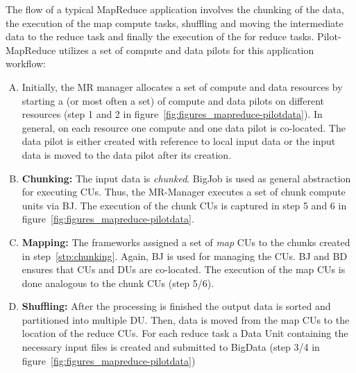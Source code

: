 \documentclass{acm_proc_article-sp}
\newcommand{\jhanote}[1]{ {\textcolor{red} { ***shantenu: #1 }}}
\newcommand{\alnote}[1]{ {\textcolor{blue} { ***andreL: #1 }}}
\newcommand{\pnote}[1]{ {\textcolor{magenta} { ***pradeep: #1 }}}
\newcommand{\alnote}[1]{}
\newcommand{\pnote}[1]{}
\newcommand{\jhanote}[1]{}
\newcommand{\pilotmapreduce}{Pilot-MapReduce\xspace}
\begin{document}
The flow of a typical MapReduce application involves the chunking of
the data, the execution of the map compute tasks, shuffling and moving
the intermediate data to the reduce task and finally the execution of
the for reduce tasks.  \pilotmapreduce utilizes a set of compute and
data pilots for this application workflow: %
\begin{enumerate}[A.]
	\item Initially, the MR manager allocates a set of compute and data 
	resources by starting a (or most often a set) of compute and data pilots on 
	different resources (step 1 and 2 in 
	figure~\ref{fig:figures_mapreduce-pilotdata}). In
	general, on each resource one compute and one data pilot is co-located. The 
	data pilot is either created with reference to local input data or the input 
	data is moved to the data pilot after its creation.

	\item \textbf{Chunking:} The input data is {\it chunked}. BigJob is used 
	as general abstraction for executing CUs. Thus, the MR-Manager executes a 	
	set of chunk compute units via BJ. The execution of the chunk CUs is 
	captured in step 5 and 6 in figure~\ref{fig:figures_mapreduce-pilotdata}. \label{stp:chunking}
	
	\item \textbf{Mapping:} The frameworks assigned a set of {\it map} CUs to 
	the chunks created in step~\ref{stp:chunking}. Again, BJ is used for 
	managing the CUs. BJ and BD ensures that CUs and DUs are co-located. The 
	execution of the map CUs is done analogous to the chunk CUs (step 5/6).
	
	\item \textbf{Shuffling:} %
		After the processing is finished the output data is sorted and 
		partitioned into multiple DU. Then, data is moved from the map CUs to 
		the location of the reduce CUs. For each reduce task a Data Unit 
		containing the necessary input files is created and submitted to BigData 
		(step 3/4 in figure~\ref{fig:figures_mapreduce-pilotdata})
		

\end{enumerate}
\end{document}
